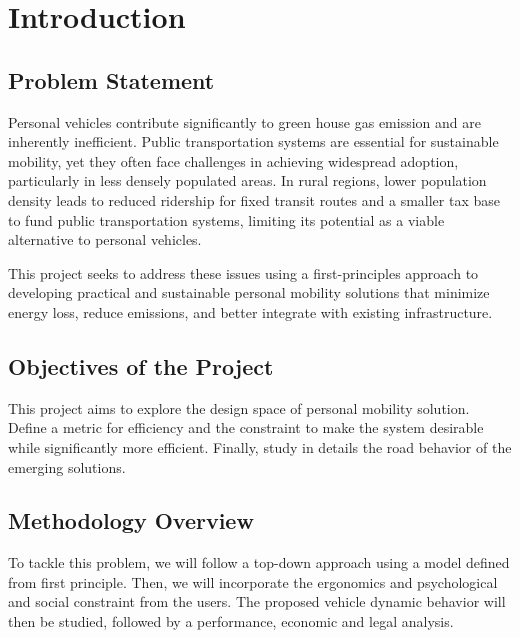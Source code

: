 \section{Introduction}

\subsection{Problem Statement}

Personal vehicles contribute significantly to green house gas emission and are inherently inefficient.\cite{us_epa_carbon_2015} Public transportation systems are essential for sustainable mobility, yet they often face challenges in achieving widespread adoption, particularly in less densely populated areas. In rural regions, lower population density leads to reduced ridership for fixed transit routes and a smaller tax base to fund public transportation systems, limiting its potential as a viable alternative to personal vehicles.\cite{noauthor_barriers_nodate}

 This project seeks to address these issues using a first-principles approach to developing practical and sustainable personal mobility solutions that minimize energy loss, reduce emissions, and better integrate with existing infrastructure.

\subsection{Objectives of the Project}

This project aims to explore the design space of personal mobility solution. Define a metric for efficiency and the constraint to make the system desirable while significantly more efficient. Finally, study in details the road behavior of the emerging solutions.

\subsection{Methodology Overview}

To tackle this problem, we will follow a  top-down approach using a model defined from first principle. Then, we will incorporate the ergonomics and psychological and social constraint from the users.
The proposed vehicle dynamic behavior will then be studied, followed by a performance, economic and legal analysis.